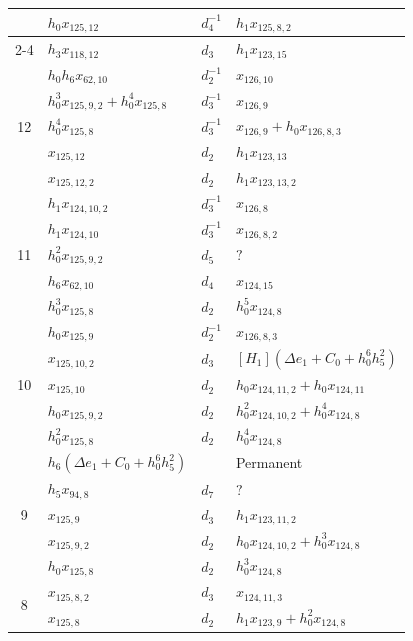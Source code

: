 \begin{table}[htbp]
{\begin{tabular}{|c|l|l|l|}
 & $h_0x_{125,12}$ & $d_{4}^{-1}$ & $h_1x_{125,8,2}$ \\\cline{2-4}
 & $h_3x_{118,12}$ & $d_{3}$ & $h_1x_{123,15}$ \\\hline\hline
\multirow{5}{*}{12} & $h_0h_6x_{62,10}$ & $d_{2}^{-1}$ & $x_{126,10}$ \\\cline{2-4}
 & $h_0^3x_{125,9,2}+h_0^4x_{125,8}$ & $d_{3}^{-1}$ & $x_{126,9}$ \\\cline{2-4}
 & $h_0^4x_{125,8}$ & $d_{3}^{-1}$ & $x_{126,9}+h_0x_{126,8,3}$ \\\cline{2-4}
 & $x_{125,12}$ & $d_{2}$ & $h_1x_{123,13}$ \\\cline{2-4}
 & $x_{125,12,2}$ & $d_{2}$ & $h_1x_{123,13,2}$ \\\hline\hline
\multirow{5}{*}{11} & $h_1x_{124,10,2}$ & $d_{3}^{-1}$ & $x_{126,8}$ \\\cline{2-4}
 & $h_1x_{124,10}$ & $d_{3}^{-1}$ & $x_{126,8,2}$ \\\cline{2-4}
 & $h_0^2x_{125,9,2}$ & $d_{5}$ & $?$ \\\cline{2-4}
 & $h_6x_{62,10}$ & $d_{4}$ & $x_{124,15}$ \\\cline{2-4}
 & $h_0^3x_{125,8}$ & $d_{2}$ & $h_0^5x_{124,8}$ \\\hline\hline
\multirow{5}{*}{10} & $h_0x_{125,9}$ & $d_{2}^{-1}$ & $x_{126,8,3}$ \\\cline{2-4}
 & $x_{125,10,2}$ & $d_{3}$ & $[H_1](\Delta e_1+C_0+h_0^6h_5^2)$ \\\cline{2-4}
 & $x_{125,10}$ & $d_{2}$ & $h_0x_{124,11,2}+h_0x_{124,11}$ \\\cline{2-4}
 & $h_0x_{125,9,2}$ & $d_{2}$ & $h_0^2x_{124,10,2}+h_0^4x_{124,8}$ \\\cline{2-4}
 & $h_0^2x_{125,8}$ & $d_{2}$ & $h_0^4x_{124,8}$ \\\hline\hline
\multirow{5}{*}{9} & $h_6(\Delta e_1+C_0+h_0^6h_5^2)$ & & Permanent \\\cline{2-4}
 & $h_5x_{94,8}$ & $d_{7}$ & $?$ \\\cline{2-4}
 & $x_{125,9}$ & $d_{3}$ & $h_1x_{123,11,2}$ \\\cline{2-4}
 & $x_{125,9,2}$ & $d_{2}$ & $h_0x_{124,10,2}+h_0^3x_{124,8}$ \\\cline{2-4}
 & $h_0x_{125,8}$ & $d_{2}$ & $h_0^3x_{124,8}$ \\\hline\hline
\multirow{2}{*}{8} & $x_{125,8,2}$ & $d_{3}$ & $x_{124,11,3}$ \\\cline{2-4}
 & $x_{125,8}$ & $d_{2}$ & $h_1x_{123,9}+h_0^2x_{124,8}$ \\\hline\hline

\end{tabular}}
\end{table}
